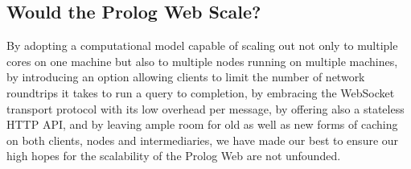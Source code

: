 \documentclass{tlp}
\begin{document}
%
%
%
%
%



\subsection{Would the Prolog Web Scale?}

By adopting a computational model capable of scaling out not only to multiple cores on one machine but also to multiple nodes running on multiple machines, by introducing an option allowing clients to limit the number of network roundtrips it takes to run a query to completion, by embracing the WebSocket transport protocol with its low overhead per message, by offering also a stateless HTTP API, and by leaving ample room for old as well as new forms of caching on both clients, nodes and intermediaries, we have made our best to ensure our high hopes for the scalability of the Prolog Web are not unfounded.
\end{document}

